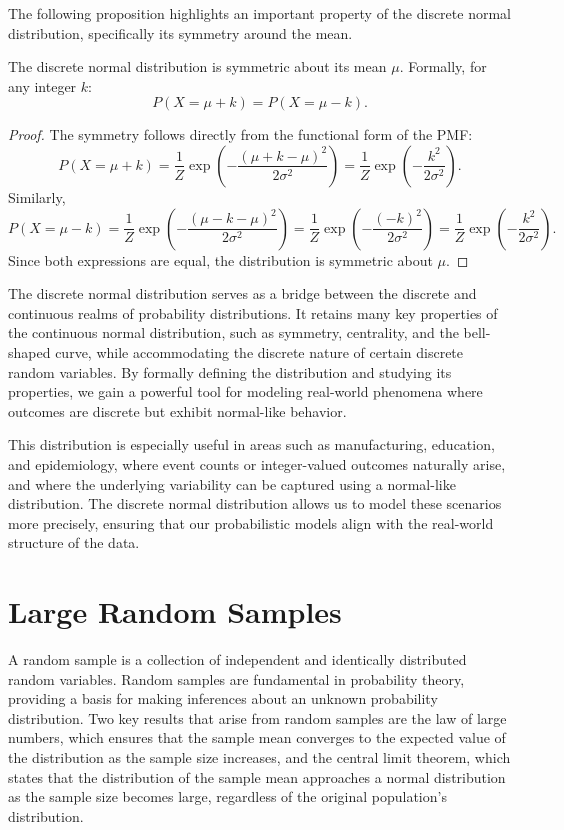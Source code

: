 The following proposition highlights an important property of the discrete normal distribution, specifically its symmetry around the mean.

\begin{proposition}
The discrete normal distribution is symmetric about its mean \( \mu \). Formally, for any integer \( k \):
\[
P(X = \mu + k) = P(X = \mu - k).
\]
\end{proposition}
\begin{proof}
The symmetry follows directly from the functional form of the PMF:
\[
P(X = \mu + k) = \frac{1}{Z} \exp\left( -\frac{(\mu + k - \mu)^2}{2\sigma^2} \right) = \frac{1}{Z} \exp\left( -\frac{k^2}{2\sigma^2} \right).
\]
Similarly,
\[
P(X = \mu - k) = \frac{1}{Z} \exp\left( -\frac{(\mu - k - \mu)^2}{2\sigma^2} \right) = \frac{1}{Z} \exp\left( -\frac{(-k)^2}{2\sigma^2} \right) = \frac{1}{Z} \exp\left( -\frac{k^2}{2\sigma^2} \right).
\]
Since both expressions are equal, the distribution is symmetric about \( \mu \).
\end{proof}

The discrete normal distribution serves as a bridge between the discrete and continuous realms of probability distributions. It retains many key properties of the continuous normal distribution, such as symmetry, centrality, and the bell-shaped curve, while accommodating the discrete nature of certain discrete random variables. By formally defining the distribution and studying its properties, we gain a powerful tool for modeling real-world phenomena where outcomes are discrete but exhibit normal-like behavior.

This distribution is especially useful in areas such as manufacturing, education, and epidemiology, where event counts or integer-valued outcomes naturally arise, and where the underlying variability can be captured using a normal-like distribution. The discrete normal distribution allows us to model these scenarios more precisely, ensuring that our probabilistic models align with the real-world structure of the data.

%
%

\section{Large Random Samples}
\label{sec:probability_random_samples}

A random sample is a collection of independent and identically distributed random variables. Random samples are fundamental in probability theory, providing a basis for making inferences about an unknown probability distribution. Two key results that arise from random samples are the law of large numbers, which ensures that the sample mean converges to the expected value of the distribution as the sample size increases, and the central limit theorem, which states that the distribution of the sample mean approaches a normal distribution as the sample size becomes large, regardless of the original population's distribution.

